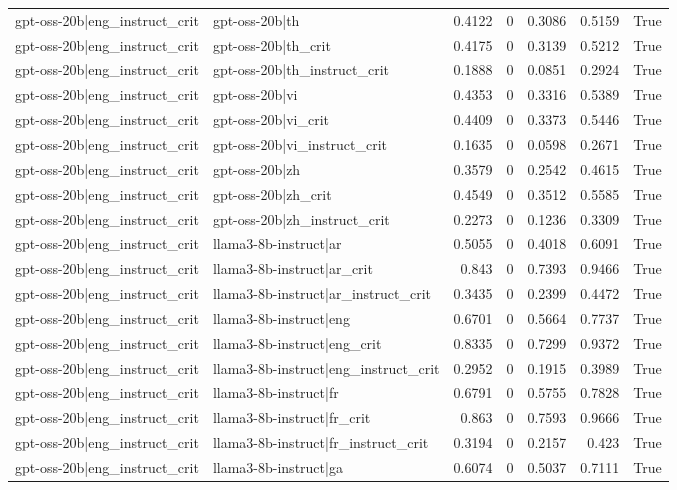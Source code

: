 \begin{table}
\begin{tabular}{l l r r r r l}
gpt-oss-20b|eng_instruct_crit & gpt-oss-20b|th & 0.4122 & 0 & 0.3086 & 0.5159 & True \\
gpt-oss-20b|eng_instruct_crit & gpt-oss-20b|th_crit & 0.4175 & 0 & 0.3139 & 0.5212 & True \\
gpt-oss-20b|eng_instruct_crit & gpt-oss-20b|th_instruct_crit & 0.1888 & 0 & 0.0851 & 0.2924 & True \\
gpt-oss-20b|eng_instruct_crit & gpt-oss-20b|vi & 0.4353 & 0 & 0.3316 & 0.5389 & True \\
gpt-oss-20b|eng_instruct_crit & gpt-oss-20b|vi_crit & 0.4409 & 0 & 0.3373 & 0.5446 & True \\
gpt-oss-20b|eng_instruct_crit & gpt-oss-20b|vi_instruct_crit & 0.1635 & 0 & 0.0598 & 0.2671 & True \\
gpt-oss-20b|eng_instruct_crit & gpt-oss-20b|zh & 0.3579 & 0 & 0.2542 & 0.4615 & True \\
gpt-oss-20b|eng_instruct_crit & gpt-oss-20b|zh_crit & 0.4549 & 0 & 0.3512 & 0.5585 & True \\
gpt-oss-20b|eng_instruct_crit & gpt-oss-20b|zh_instruct_crit & 0.2273 & 0 & 0.1236 & 0.3309 & True \\
gpt-oss-20b|eng_instruct_crit & llama3-8b-instruct|ar & 0.5055 & 0 & 0.4018 & 0.6091 & True \\
gpt-oss-20b|eng_instruct_crit & llama3-8b-instruct|ar_crit & 0.843 & 0 & 0.7393 & 0.9466 & True \\
gpt-oss-20b|eng_instruct_crit & llama3-8b-instruct|ar_instruct_crit & 0.3435 & 0 & 0.2399 & 0.4472 & True \\
gpt-oss-20b|eng_instruct_crit & llama3-8b-instruct|eng & 0.6701 & 0 & 0.5664 & 0.7737 & True \\
gpt-oss-20b|eng_instruct_crit & llama3-8b-instruct|eng_crit & 0.8335 & 0 & 0.7299 & 0.9372 & True \\
gpt-oss-20b|eng_instruct_crit & llama3-8b-instruct|eng_instruct_crit & 0.2952 & 0 & 0.1915 & 0.3989 & True \\
gpt-oss-20b|eng_instruct_crit & llama3-8b-instruct|fr & 0.6791 & 0 & 0.5755 & 0.7828 & True \\
gpt-oss-20b|eng_instruct_crit & llama3-8b-instruct|fr_crit & 0.863 & 0 & 0.7593 & 0.9666 & True \\
gpt-oss-20b|eng_instruct_crit & llama3-8b-instruct|fr_instruct_crit & 0.3194 & 0 & 0.2157 & 0.423 & True \\
gpt-oss-20b|eng_instruct_crit & llama3-8b-instruct|ga & 0.6074 & 0 & 0.5037 & 0.7111 & True \\

\end{tabular}
\end{table}
